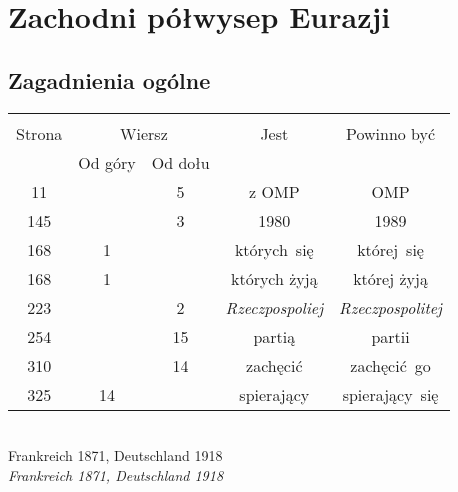 \documentclass[a4paper,11pt]{article}
\begin{document}
\vspace{\spaceTwo}








\section{Zachodni półwysep Eurazji}

\vspace{\spaceTwo}



\subsection{Zagadnienia ogólne}

\vspace{\spaceThree}






\begin{center}
  \begin{tabular}{|c|c|c|c|c|}
    \hline
    & \multicolumn{2}{c|}{} & & \\
    Strona & \multicolumn{2}{c|}{Wiersz} & Jest
                              & Powinno być \\ \cline{2-3}
    & Od góry & Od dołu & & \\
    \hline
    11  & &  5 & z OMP & OMP \\
    145 & &  3 & 1980 & 1989 \\
    168 &  1 & & których~się & której~się \\
    168 &  1 & & których żyją & której żyją \\
    223 & &  2 & \emph{Rzeczpospoliej} & \emph{Rzeczpospolitej} \\
    254 & & 15 & partią & partii \\
    310 & & 14 & zachęcić & zachęcić~go \\
    325 & 14 & & spierający & spierający~się \\
    \hline
  \end{tabular}
\end{center}
\noi 
{} \\
\Jest Frankreich 1871, Deutschland 1918 \\
\Pow  \emph{Frankreich 1871, Deutschland 1918} \\
\end{document}
